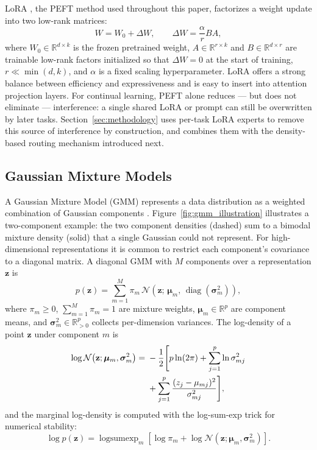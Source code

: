 LoRA \citep{hu2022lora}, the PEFT method used throughout this paper, factorizes a weight update into two low-rank matrices:
\begin{equation}
W = W_0 + \Delta W, \qquad \Delta W = \frac{\alpha}{r}BA,
\label{eq:lora}
\end{equation}
where $W_0\in\mathbb{R}^{d\times k}$ is the frozen pretrained weight, $A\in\mathbb{R}^{r\times k}$ and $B\in\mathbb{R}^{d\times r}$ are trainable low-rank factors initialized so that $\Delta W=0$ at the start of training, $r\ll\min(d,k)$, and $\alpha$ is a fixed scaling hyperparameter. LoRA offers a strong balance between efficiency and expressiveness and is easy to insert into attention projection layers. For continual learning, PEFT alone reduces --- but does not eliminate --- interference: a single shared LoRA or prompt can still be overwritten by later tasks. Section~\ref{sec:methodology} uses per-task LoRA experts to remove this source of interference by construction, and combines them with the density-based routing mechanism introduced next.

\subsection{Gaussian Mixture Models}
\label{sec:gmm_background}

A Gaussian Mixture Model (GMM) represents a data distribution as a weighted combination of Gaussian components \citep{bishop2006pattern}. Figure~\ref{fig:gmm_illustration} illustrates a two-component example: the two component densities (dashed) sum to a bimodal mixture density (solid) that a single Gaussian could not represent. For high-dimensional representations it is common to restrict each component's covariance to a diagonal matrix. A diagonal GMM with $M$ components over a representation $\mathbf{z}$ is
\begin{equation}
    p(\mathbf{z}) = \sum_{m=1}^{M} \pi_m\, \mathcal{N}\!\left(\mathbf{z};\, \bm{\mu}_m,\, \operatorname{diag}\!\left(\bm{\sigma}_m^{2}\right)\right),
    \label{eq:gmm}
\end{equation}
where $\pi_m\geq0$, $\sum_{m=1}^{M}\pi_m=1$ are mixture weights, $\bm{\mu}_m\in\mathbb{R}^p$ are component means, and $\bm{\sigma}_m^{2}\in\mathbb{R}^p_{>0}$ collects per-dimension variances. The log-density of a point $\mathbf{z}$ under component $m$ is
\begin{align}
    \log \mathcal{N}\!\left(\mathbf{z};\bm{\mu}_m, \bm{\sigma}_m^2\right)
    ={} & -\frac{1}{2}\Biggl[p\ln(2\pi) + \sum_{j=1}^p \ln \sigma_{mj}^2 \notag \\
    & + \sum_{j=1}^p \frac{(z_j - \mu_{mj})^2}{\sigma_{mj}^2}\Biggr],
    \label{eq:logN}
\end{align}
and the marginal log-density is computed with the log-sum-exp trick for numerical stability:
\begin{equation}
    \log p(\mathbf{z}) = \operatorname{logsumexp}_m\!\left[\log\pi_m + \log \mathcal{N}(\mathbf{z};\bm{\mu}_m,\bm{\sigma}_m^{2})\right].
    \label{eq:logpk}
\end{equation}

